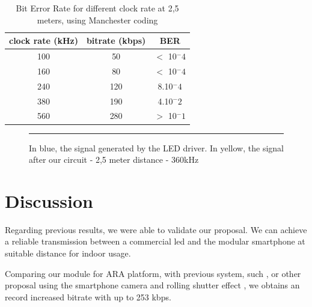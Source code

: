 \begin{table}[htbp]
\begin{center}
\begin{tabular}{|c|c|c|}
  \hline
  clock rate (kHz) & bitrate (kbps) & BER \\
  \hline
  100 & 50 & $<$ 10$^-4$ \\
  160 & 80 & $<$ 10$^-4$ \\
  240 & 120 & 8.10$^-4$ \\
  380 & 190 & 4.10$^-2$ \\
  560 & 280 & $>$ 10$^-1$ \\
  \hline
\end{tabular}
\end{center}
\caption{Bit Error Rate for different clock rate at 2,5 meters, using Manchester coding}
\label{tab:ber-manchester}
\end{table}

\begin{figure}[htbp]
	\centering
		\rule{35em}{0.5pt}
		\caption[In blue, the signal generated by the LED driver. In yellow, the signal after our circuit - 2,5 meter distance - 360kHz]{In blue, the signal generated by the LED driver. In yellow, the signal after our circuit - 2,5 meter distance - 360kHz}
		\label{fig:manchester-problem}
	\end{figure}
    
 

\section{Discussion}

Regarding previous results, we were able to validate our proposal. We can achieve a reliable transmission between a commercial led and the modular smartphone at suitable distance for indoor usage.

Comparing our  module for ARA platform, with previous system, such \citep{phycomp}, or other proposal using the smartphone camera and rolling shutter effect  \citep{rolling}, we obtains an record increased bitrate with up to 253 kbps.
\citep{phycomp}